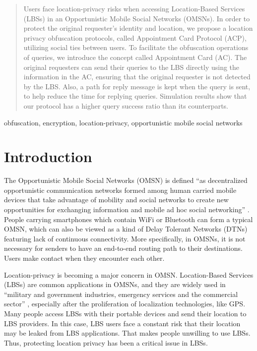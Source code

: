 \documentclass[conference]{IEEEtran}
\begin{document}
\begin{abstract}

Users face location-privacy risks when accessing Location-Based Services (LBSs) in an Opportunistic Mobile Social Networks (OMSNs). In order to protect the original requester's identity and location, we propose a location privacy obfuscation protocols, called Appointment Card Protocol (ACP), utilizing social ties between users. To facilitate the obfuscation operations of queries, we introduce the concept called Appointment Card (AC). The original requesters can send their queries to the LBS directly using the information in the AC, ensuring that the original requester is not detected by the LBS. Also, a path for reply message is kept when the query is sent, to help reduce the time for replying queries. Simulation results show that our protocol has a higher query success ratio than its counterparts.

\end{abstract}

\begin{IEEEkeywords}
obfuscation, encryption, location-privacy, opportunistic mobile social networks
\end{IEEEkeywords}

\section{Introduction}

The Opportunistic Mobile Social Networks (OMSN) is defined ``as decentralized opportunistic communication networks formed among human carried mobile devices that take advantage of mobility and social networks to create new opportunities for exchanging information and mobile ad hoc social networking'' \cite {C24}. People carrying smartphones which contain WiFi or Bluetooth can form a typical OMSN, which can also be viewed as a kind of Delay Tolerant Networks (DTNs) \cite {C1} featuring lack of continuous connectivity. More specifically, in OMSNs, it is not necessary for senders to have an end-to-end routing path to their destinations. Users make contact when they encounter each other. 

Location-privacy is becoming a major concern in OMSN.  Location-Based Services (LBSs) are common applications in OMSNs, and they are widely used in ``military and government industries, emergency services and the commercial sector'' \cite {C2}, especially after the proliferation of localization technologies, like GPS. Many people access LBSs with their portable devices and send their location to LBS providers. In this case, LBS users face a constant risk that their location may be leaked from LBS applications. That makes people unwilling to use LBSs. Thus, protecting location privacy has been a critical issue in LBSs.
\end{document}
